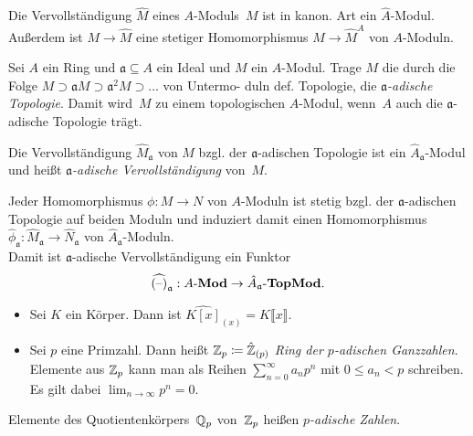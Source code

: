 \documentclass{cheat-sheet}
\newcommand{\Mod}{\mathbf{Mod}} %
\newcommand{\TopMod}{\mathbf{TopMod}} %
\newcommand{\LMod}[1]{{#1}\text{-}\Mod} %
\newcommand{\TopLMod}[1]{{#1}\text{-}\TopMod} %
\newcommand{\aaa}{\mathfrak{a}}
\begin{document}
\begin{bem}
  Die Vervollständigung $\hat{M}$ eines $A$-Moduls~$M$ ist in kanon. Art ein $\hat{A}$-Modul.
  Außerdem ist $M \to \hat{M}$ eine stetiger Homomorphismus $M \to \hat{M}^A$ von $A$-Moduln.
\end{bem}

\begin{konstr}
  Sei $A$ ein Ring und $\aaa \subseteq A$ ein Ideal und $M$ ein $A$-Modul.
  Trage $M$ die durch die Folge $M \supset \aaa M \supset \aaa^2 M \supset \ldots$ von Untermo- duln def. Topologie, die \textit{$\aaa$-adische Topologie}.
  Damit wird~$M$ zu einem topologischen $A$-Modul, wenn~$A$ auch die $\aaa$-adische Topologie trägt.
\end{konstr}

\begin{defn}
  Die Vervollständigung $\hat{M}_\aaa$ von $M$ bzgl. der $\aaa$-adischen Topologie ist ein $\hat{A}_\aaa$-Modul und heißt \emph{$\aaa$-adische Vervollständigung} von~$M$.
\end{defn}

\begin{bem}
  Jeder Homomorphismus $\phi : M \to N$ von $A$-Moduln ist stetig bzgl. der $\aaa$-adischen Topologie auf beiden Moduln und induziert damit einen Homomorphismus $\hat{\phi}_\aaa : \hat{M}_\aaa \to \hat{N}_\aaa$ von $\hat{A}_\aaa$-Moduln. \\
  Damit ist $\aaa$-adische Vervollständigung ein Funktor
  \[
    \widehat{(\blank)}_\aaa : \LMod{A} \to \TopLMod{\hat{A}_\aaa}.
  \]
\end{bem}

\begin{bspe}
  \begin{itemize}
    \item Sei $K$ ein Körper.
    Dann ist $\widehat{K[x]}_{(x)} = K \llbracket x \rrbracket$.
    \item Sei $p$ eine Primzahl.
    Dann heißt $\mathbb{Z}_p \coloneqq \hat{\mathbb{Z}}_{(p)}$ \emph{Ring der $p$-adischen Ganzzahlen}.
    Elemente aus $\mathbb{Z}_p$ kann man als Reihen ${\sum}_{n=0}^\infty a_n p^n$ mit $0 \leq a_n < p$ schreiben.
    Es gilt dabei $\lim_{n \to \infty} p^n = 0$.
  \end{itemize}
\end{bspe}

\begin{defn}
  Elemente des Quotientenkörpers~$\mathbb{Q}_p$ von~$\mathbb{Z}_p$ heißen \emph{$p$-adische Zahlen}.
\end{defn}
\end{document}
